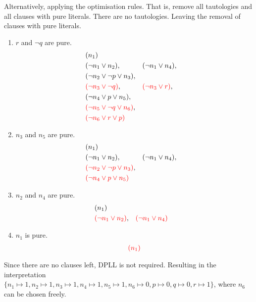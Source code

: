 \documentclass[11pt,a4paper]{article}
\begin{document}
Alternatively, applying the optimisation rules. That is, remove all tautologies and all clauses with pure literals. There are no tautologies. Leaving the removal of clauses with pure literals.
\begin{enumerate}
\item  $r$ and $\neg q$ are pure.
\begin{align*}
& (n_1) \\
& (\neg n_1 \lor n_2 ), && (\neg  n_1 \lor n_4), \\
& (\neg n_2 \lor \neg p \lor n_3), \\
& \textcolor{red}{(\neg n_3 \lor \neg q)} , &&  \textcolor{red}{(\neg n_3 \lor r)}, \\
& (\neg n_4 \lor p \lor n_5), \\
& \textcolor{red}{(\neg n_5 \lor \neg q \lor n_6)}, \\
& \textcolor{red}{(\neg n_6 \lor r \lor p)}
\end{align*}
\item  $n_3$ and $n_5$ are pure.
\begin{align*}
& (n_1) \\
& (\neg n_1 \lor n_2 ), && (\neg  n_1 \lor n_4), \\
& \textcolor{red}{(\neg n_2 \lor \neg p \lor n_3)}, \\
& \textcolor{red}{(\neg n_4 \lor p \lor n_5)} \\
\end{align*}
\item  $n_2$ and $n_4$ are pure.
\begin{align*}
& (n_1) \\
& \textcolor{red}{(\neg n_1 \lor n_2 )}, && \textcolor{red}{(\neg  n_1 \lor n_4)} \\
\end{align*}
\item  $n_1$ is pure.
\begin{align*}
& \textcolor{red}{(n_1)} \\
\end{align*}
\end{enumerate}
Since there are no clauses left, DPLL is not required.
Resulting in the interpretation $\{n_1 \mapsto 1, n_2 \mapsto 1, n_3 \mapsto 1, n_4 \mapsto 1, n_5 \mapsto 1, n_6 \mapsto 0, p \mapsto 0, q \mapsto 0, r \mapsto 1\}$, where $n_6$ can be chosen freely.
\end{document}
